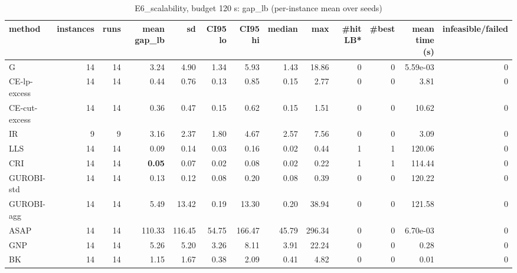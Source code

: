 \begin{table}[htbp]
\centering
\small
\caption{E6\_scalability, budget 120 s: gap\_lb (per-instance mean over seeds)}
\label{tab:E6_scalability_b120_summary}
\begin{tabular}{lrrrrrrrrrrrr}
\toprule
method & instances & runs & mean gap\_lb & sd & CI95 lo & CI95 hi & median & max & \#hit LB* & \#best & mean time (s) & infeasible/failed \\
\midrule
G & 14 & 14 & 3.24 & 4.90 & 1.34 & 5.93 & 1.43 & 18.86 & 0 & 0 & 5.59e-03 & 0 \\
CE-lp-excess & 14 & 14 & 0.44 & 0.76 & 0.13 & 0.85 & 0.15 & 2.77 & 0 & 0 & 3.81 & 0 \\
CE-cut-excess & 14 & 14 & 0.36 & 0.47 & 0.15 & 0.62 & 0.15 & 1.51 & 0 & 0 & 10.62 & 0 \\
IR & 9 & 9 & 3.16 & 2.37 & 1.80 & 4.67 & 2.57 & 7.56 & 0 & 0 & 3.09 & 0 \\
LLS & 14 & 14 & 0.09 & 0.14 & 0.03 & 0.16 & 0.02 & 0.44 & 1 & 1 & 120.06 & 0 \\
CRI & 14 & 14 & \textbf{0.05} & 0.07 & 0.02 & 0.08 & 0.02 & 0.22 & 1 & 1 & 114.44 & 0 \\
GUROBI-std & 14 & 14 & 0.13 & 0.12 & 0.08 & 0.20 & 0.08 & 0.39 & 0 & 0 & 120.22 & 0 \\
GUROBI-agg & 14 & 14 & 5.49 & 13.42 & 0.19 & 13.30 & 0.20 & 38.94 & 0 & 0 & 121.58 & 0 \\
ASAP & 14 & 14 & 110.33 & 116.45 & 54.75 & 166.47 & 45.79 & 296.34 & 0 & 0 & 6.70e-03 & 0 \\
GNP & 14 & 14 & 5.26 & 5.20 & 3.26 & 8.11 & 3.91 & 22.24 & 0 & 0 & 0.28 & 0 \\
BK & 14 & 14 & 1.15 & 1.67 & 0.38 & 2.09 & 0.41 & 4.82 & 0 & 0 & 0.01 & 0 \\
\bottomrule
\end{tabular}
\end{table}
